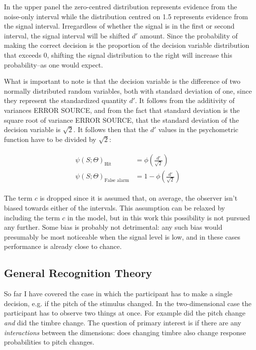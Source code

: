 \documentclass{article}\usepackage{knitr}
\begin{document}
In the upper panel the zero-centred distribution represents evidence from the noise-only interval while the distribution centred on 1.5 represents evidence from the signal interval. Irregardless of whether the signal is in the first or second interval, the signal interval will be shifted $d'$ amount. Since the probability of making the correct decision is the proportion of the decision variable distribution that exceeds 0, shifting the signal distribution to the right will increase this probability--as one would expect.

What is important to note is that the decision variable is the difference of two normally distributed random variables, both with standard  deviation of one, since they represent the standardized quantity $d'$. It follows from the additivity of variances ERROR SOURCE, and from the fact that standard deviation is the square root of variance ERROR SOURCE, that the standard deviation of the decision variable is $\sqrt{2}$. It follows then that the $d'$ values in the psychometric function have to be divided by $\sqrt{2}$:

\begin{align*}
\begin{split}
\psi(S; \Theta)_{\text{Hit}} &= \phi(\frac{d'}{\sqrt{2}}) \\
\psi(S; \Theta)_{\text{False alarm}} &=  1 - \phi(\frac{d'}{\sqrt{2}})
\end{split}
\end{align*}

The term $c$ is dropped since it is assumed that, on average, the observer isn't biased towards either of the intervals. This assumption can be relaxed by including the term $c$ in the model, but in this work this possibility is not pursued any further. Some bias is probably not detrimental: any such bias would presumably be most noticeable when the signal level is low, and in these cases performance is already close to chance. 



\subsection{General Recognition Theory}
\label{sec:grt_mdls}

So far I have covered the case in which the participant has to make a single decision, e.g. if the pitch of the stimulus changed. In the two-dimensional case the participant has to observe two things at once. For example did the pitch change \textit{and} did the timbre change. The question of primary interest is if there are any \textit{interactions} between the dimensions: does changing timbre also change response probabilities to pitch changes.
\end{document}
